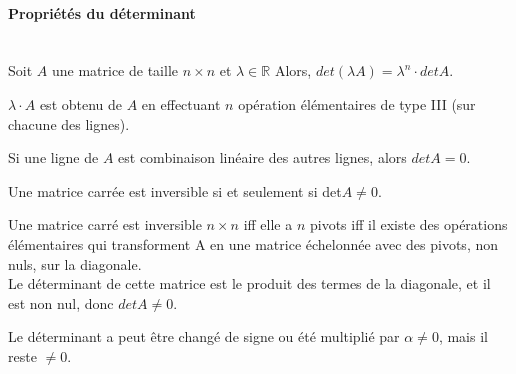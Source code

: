 \paragraph{Propriétés du déterminant}
\\

Soit $A$ une matrice de taille $n \times n$ et $\lambda \in \mathbb{R}$ Alors, $det (\lambda A) = \lambda^n \cdot det A $.
\begin{preuve}
    $\lambda \cdot A$ est obtenu de $A$ en effectuant $n$ opération élémentaires de type III (sur chacune des lignes).
    \end{preuve}
    \begin{framedremark}
        Si une ligne de $A$ est combinaison linéaire des autres lignes, alors $det A = 0$.
    \end{framedremark}
    \begin{theorem}
        Une matrice carrée est inversible si et seulement si det$A \neq 0$.
    \end{theorem}
    \begin{preuve}
        Une matrice carré est inversible $n\times n$ iff elle a $n$ pivots iff il existe des opérations élémentaires qui transforment A en une matrice échelonnée avec des pivots, non nuls, sur la diagonale.
        \\
        Le déterminant de cette matrice est le produit des termes de la diagonale, et il est non nul, donc $det A \neq 0$.
    \end{preuve}
    \begin{framedremark}
        Le déterminant a peut être changé de signe ou été multiplié par $\alpha \neq 0$, mais il reste $\neq 0$.
    \end{framedremark}
    
